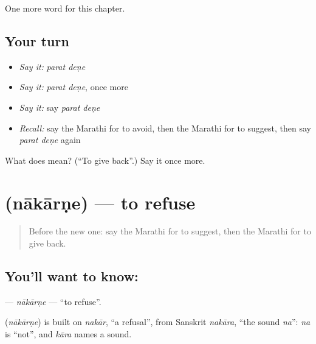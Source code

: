 \begin{grammarlens}[title={What you've built}]
One more word for this chapter.
\end{grammarlens}

\subsection*{Your turn}
\begin{itemize}
\raggedright
  \item \emph{Say it:} \emph{parat deṇe}
  \item \emph{Say it:} \emph{parat deṇe}, once more
  \item \emph{Say it:} say \emph{parat deṇe}
  \item \emph{Recall:} say the Marathi for to avoid, then the Marathi for to suggest, then say \emph{parat deṇe} again
\end{itemize}

\begin{tcolorbox}[breakable,colback=teal!4,colframe=teal!35!black,title={Before you move on}]
What does   mean? (\textquotedblleft{}To give back\textquotedblright{}.) Say it once more.
\end{tcolorbox}
\section[\texorpdfstring{\mr{नाकारणे} (nākārṇe)}{नाकारणे (nākārṇe)}]{ (nākārṇe) — to refuse}

\label{lesson:MR-C226-nakarne}



\begin{quote}
Before the new one: say the Marathi for to suggest, then the Marathi for to give back.
\end{quote}

\subsection*{You'll want to know: }
\textbf{} — \emph{nākārṇe} — \textquotedblleft{}to refuse\textquotedblright{}.

\begin{cousinweb}
\textbf{} (\emph{nākārṇe}) is built on \emph{nakār}, \textquotedblleft{}a refusal\textquotedblright{}, from Sanskrit \emph{nakāra}, \textquotedblleft{}the sound \emph{na}\textquotedblright{}: \emph{na} is \textquotedblleft{}not\textquotedblright{}, and \emph{kāra} names a sound.
\end{cousinweb}

